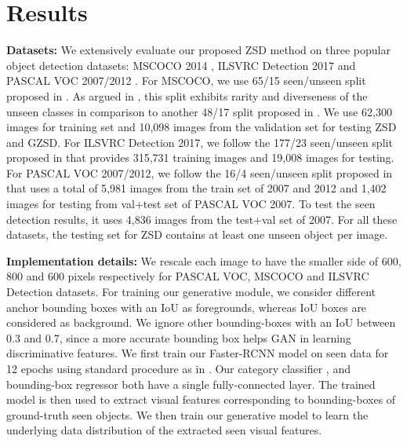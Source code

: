 \documentclass[runningheads]{llncs}
\begin{document}
\section{Results}

\noindent\textbf{Datasets:} We extensively evaluate our proposed ZSD method on three popular object detection datasets: MSCOCO 2014 \cite{MSCOCO_2014}, ILSVRC Detection 2017 \cite{ILSVRC_2015} and PASCAL VOC 2007/2012 \cite{VOC_IJCV_2010}. For MSCOCO, we use 65/15 seen/unseen split proposed in \cite{rahman2018polarity}. As argued in \cite{rahman2018polarity}, this split exhibits rarity and diverseness of the unseen classes in comparison to another 48/17 split proposed in \cite{bansal2018zero}. 
We use 62,300 images for training set and 10,098 images from the validation set for testing ZSD and GZSD. For ILSVRC Detection 2017, we follow the 177/23 seen/unseen split proposed in \cite{rahman2018zero} that provides 315,731 training images and 19,008 images for testing. For PASCAL VOC 2007/2012, we follow the 16/4 seen/unseen split proposed in \cite{demirel2018zero} that uses a total of 5,981 images from the train set of 2007 and 2012 and 1,402 images for testing from val+test set of PASCAL VOC 2007. To test the seen detection results, it uses 4,836 images from the test+val set of 2007. For all these datasets, the testing set for ZSD contains at least one unseen object per image.

\noindent\textbf{Implementation details:} We rescale each image to have the smaller side of {600, 800 and 600} pixels respectively for PASCAL VOC, MSCOCO and ILSVRC Detection datasets. For training our generative module, we consider different anchor bounding boxes with an IoU  as foregrounds, whereas IoU  boxes are considered as background. We ignore other bounding-boxes with an IoU between 0.3 and 0.7, since a more accurate bounding box helps GAN in learning discriminative features. We first train our Faster-RCNN model on seen data for {12} epochs using standard procedure as in \cite{mmdetection}. Our category classifier , and bounding-box regressor  both have a single fully-connected layer. The trained model is then used to extract visual features corresponding to bounding-boxes of ground-truth seen objects. We then train our generative model to learn the underlying data distribution of the extracted seen visual features. 
\end{document}
